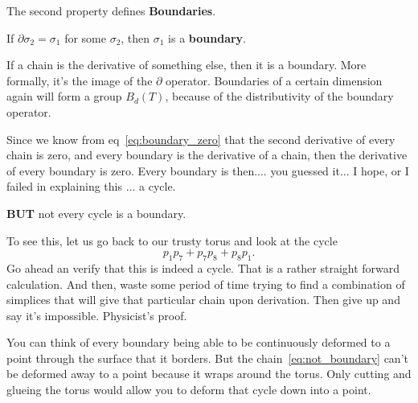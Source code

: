The second property defines \textbf{Boundaries}.
\begin{definition}[Boundary]
  If $\partial \sigma_2 = \sigma_1$ for some $\sigma_2$, then $\sigma_1$ is a \textbf{boundary}.
\end{definition}
 If a chain is the derivative of something else, then it is a boundary.  More formally, it's the image of the $\partial$ operator.  Boundaries of a certain dimension again will form a group $B_d (T)$, because of the distributivity of the boundary operator.

Since we know from eq~\ref{eq:boundary_zero} that the second derivative of every chain is zero, and every boundary is the derivative of a chain, then the derivative of every boundary is zero. Every boundary is then.... you guessed it... I hope, or I failed in explaining this ... a cycle.

\textbf{BUT} not every cycle is a boundary.

To see this, let us go back to our trusty torus and look at the cycle
\begin{equation}\label{eq:not_boundary}
  p_1 p_7 + p_7 p_8 + p_8 p_1.
\end{equation}
Go ahead an verify that this is indeed a cycle.  That is a rather straight forward calculation.  And then, waste some period of time trying to find a combination of simplices that will give that particular chain upon derivation.  Then give up and say it's impossible.  Physicist's proof.

You can think of every boundary being able to be continuously deformed to a point through the surface that it borders. But the chain~\ref{eq:not_boundary} can't be deformed away to a point because it wraps around the torus.  Only cutting and glueing the torus would allow you to deform that cycle down into a point.

